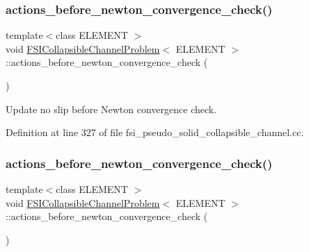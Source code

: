 \subsubsection{\texorpdfstring{actions\+\_\+before\+\_\+newton\+\_\+convergence\+\_\+check()}{actions\_before\_newton\_convergence\_check()}\hspace{0.1cm}{\footnotesize\ttfamily [3/4]}}
{\footnotesize\ttfamily template$<$class E\+L\+E\+M\+E\+NT $>$ \\
void \hyperlink{classFSICollapsibleChannelProblem}{F\+S\+I\+Collapsible\+Channel\+Problem}$<$ E\+L\+E\+M\+E\+NT $>$\+::actions\+\_\+before\+\_\+newton\+\_\+convergence\+\_\+check (\begin{DoxyParamCaption}{ }\end{DoxyParamCaption})\hspace{0.3cm}{\ttfamily [inline]}}



Update no slip before Newton convergence check. 



Definition at line 327 of file fsi\+\_\+pseudo\+\_\+solid\+\_\+collapsible\+\_\+channel.\+cc.

\mbox{\label{classFSICollapsibleChannelProblem_ace5343d2e6e6e0480d077d4f17365288}} 
\subsubsection{\texorpdfstring{actions\+\_\+before\+\_\+newton\+\_\+convergence\+\_\+check()}{actions\_before\_newton\_convergence\_check()}\hspace{0.1cm}{\footnotesize\ttfamily [4/4]}}
{\footnotesize\ttfamily template$<$class E\+L\+E\+M\+E\+NT $>$ \\
void \hyperlink{classFSICollapsibleChannelProblem}{F\+S\+I\+Collapsible\+Channel\+Problem}$<$ E\+L\+E\+M\+E\+NT $>$\+::actions\+\_\+before\+\_\+newton\+\_\+convergence\+\_\+check (\begin{DoxyParamCaption}{ }\end{DoxyParamCaption})\hspace{0.3cm}{\ttfamily [inline]}}



